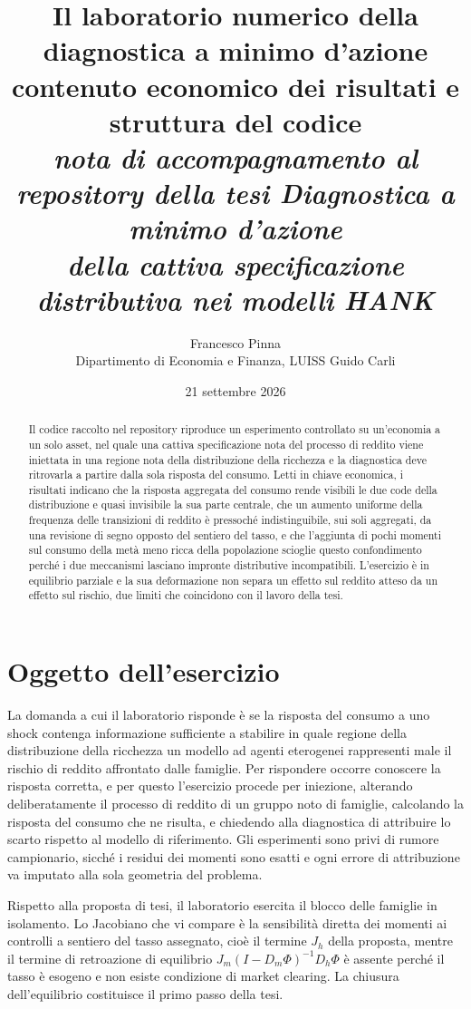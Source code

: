 \documentclass[11pt,a4paper]{article}
\title{\large\bfseries Il laboratorio numerico della diagnostica a minimo d'azione\\[2pt]
\normalsize\mdseries contenuto economico dei risultati e struttura del codice\\[4pt]
\normalsize\itshape nota di accompagnamento al repository della tesi \emph{Diagnostica a minimo d'azione\\ della cattiva specificazione distributiva nei modelli HANK}}
\author{\normalsize Francesco Pinna\\ \normalsize Dipartimento di Economia e Finanza, LUISS Guido Carli}
\date{\normalsize 21 settembre 2026}
\begin{document}
\maketitle

\begin{abstract}
\noindent Il codice raccolto nel repository riproduce un esperimento controllato su un'economia a un solo asset, nel quale una cattiva specificazione nota del processo di reddito viene iniettata in una regione nota della distribuzione della ricchezza e la diagnostica deve ritrovarla a partire dalla sola risposta del consumo. Letti in chiave economica, i risultati indicano che la risposta aggregata del consumo rende visibili le due code della distribuzione e quasi invisibile la sua parte centrale, che un aumento uniforme della frequenza delle transizioni di reddito è pressoché indistinguibile, sui soli aggregati, da una revisione di segno opposto del sentiero del tasso, e che l'aggiunta di pochi momenti sul consumo della metà meno ricca della popolazione scioglie questo confondimento perché i due meccanismi lasciano impronte distributive incompatibili. L'esercizio è in equilibrio parziale e la sua deformazione non separa un effetto sul reddito atteso da un effetto sul rischio, due limiti che coincidono con il lavoro della tesi.
\end{abstract}

\section{Oggetto dell'esercizio}\label{sec:oggetto}
La domanda a cui il laboratorio risponde è se la risposta del consumo a uno shock contenga informazione sufficiente a stabilire in quale regione della distribuzione della ricchezza un modello ad agenti eterogenei rappresenti male il rischio di reddito affrontato dalle famiglie. Per rispondere occorre conoscere la risposta corretta, e per questo l'esercizio procede per iniezione, alterando deliberatamente il processo di reddito di un gruppo noto di famiglie, calcolando la risposta del consumo che ne risulta, e chiedendo alla diagnostica di attribuire lo scarto rispetto al modello di riferimento. Gli esperimenti sono privi di rumore campionario, sicché i residui dei momenti sono esatti e ogni errore di attribuzione va imputato alla sola geometria del problema.

Rispetto alla proposta di tesi, il laboratorio esercita il blocco delle famiglie in isolamento. Lo Jacobiano che vi compare è la sensibilità diretta dei momenti ai controlli a sentiero del tasso assegnato, cioè il termine $J_h$ della proposta, mentre il termine di retroazione di equilibrio $J_m(I-D_m\Phi)^{-1}D_h\Phi$ è assente perché il tasso è esogeno e non esiste condizione di market clearing. La chiusura dell'equilibrio costituisce il primo passo della tesi.
\end{document}
